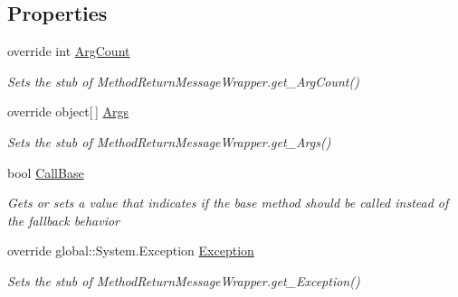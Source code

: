 \subsection*{Properties}
\begin{DoxyCompactItemize}
\item 
override int \hyperlink{class_system_1_1_runtime_1_1_remoting_1_1_messaging_1_1_fakes_1_1_stub_method_return_message_wrapper_a4da5c3eeb47929c277af491708a71627}{Arg\-Count}
\begin{DoxyCompactList}\small\item\em Sets the stub of Method\-Return\-Message\-Wrapper.\-get\-\_\-\-Arg\-Count()\end{DoxyCompactList}\item 
override object\mbox{[}$\,$\mbox{]} \hyperlink{class_system_1_1_runtime_1_1_remoting_1_1_messaging_1_1_fakes_1_1_stub_method_return_message_wrapper_ab5dcd25fbdbef1eb62a913483d244468}{Args}
\begin{DoxyCompactList}\small\item\em Sets the stub of Method\-Return\-Message\-Wrapper.\-get\-\_\-\-Args()\end{DoxyCompactList}\item 
bool \hyperlink{class_system_1_1_runtime_1_1_remoting_1_1_messaging_1_1_fakes_1_1_stub_method_return_message_wrapper_aad640a71b743f88fc30ebb44a4fae6ac}{Call\-Base}
\begin{DoxyCompactList}\small\item\em Gets or sets a value that indicates if the base method should be called instead of the fallback behavior\end{DoxyCompactList}\item 
override global\-::\-System.\-Exception \hyperlink{class_system_1_1_runtime_1_1_remoting_1_1_messaging_1_1_fakes_1_1_stub_method_return_message_wrapper_aed315c6ac968d19a3351e5bec6022617}{Exception}
\begin{DoxyCompactList}\small\item\em Sets the stub of Method\-Return\-Message\-Wrapper.\-get\-\_\-\-Exception()\end{DoxyCompactList}\item 

\end{DoxyCompactItemize}
